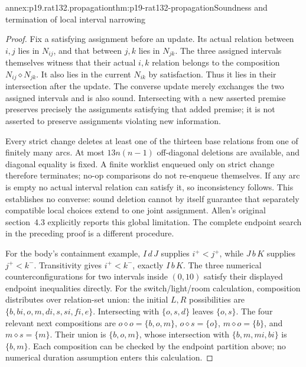 \begin{annexitem}{annex:p19.rat132.propagation}{thm:p19-rat132-propagation}{Soundness and termination of local interval narrowing}
\begin{proof}
Fix a satisfying assignment before an update. Its actual relation between
\(i,j\) lies in \(N_{ij}\), and that between \(j,k\) lies in
\(N_{jk}\). The three assigned intervals themselves witness that their
actual \(i,k\) relation belongs to the composition
\(N_{ij}\diamond N_{jk}\). It also lies in the current \(N_{ik}\)
by satisfaction. Thus it lies in their intersection after the update.
The converse update merely exchanges the two assigned intervals and is
also sound. Intersecting with a new asserted premise preserves precisely
the assignments satisfying that added premise; it is not asserted to
preserve assignments violating new information.

Every strict change deletes at least one of the thirteen base relations
from one of finitely many arcs. At most \(13n(n-1)\) off-diagonal
deletions are available, and diagonal equality is fixed. A finite worklist
enqueued only on strict change therefore terminates; no-op comparisons do
not re-enqueue themselves. If any arc is empty no actual interval relation
can satisfy it, so inconsistency follows. This establishes no converse:
sound deletion cannot by itself guarantee that separately compatible local
choices extend to one joint assignment. Allen's original section~4.3
explicitly reports this global limitation. The complete endpoint search
in the preceding proof is a different procedure.

For the body's containment example, \(I\,d\,J\) supplies
\(i^+<j^+\), while \(J\,b\,K\) supplies \(j^+<k^-\).
Transitivity gives \(i^+<k^-\), exactly \(I\,b\,K\).
The three numerical counterconfigurations for two intervals inside
\((0,10)\) satisfy their displayed endpoint inequalities directly.
For the switch/light/room calculation, composition distributes over
relation-set union: the initial \(L,R\) possibilities are
\(\{b,bi,o,m,di,s,si,fi,e\}\). Intersecting with
\(\{o,s,d\}\) leaves \(\{o,s\}\). The four relevant next
compositions are \(o\diamond o=\{b,o,m\}\),
\(o\diamond s=\{o\}\), \(m\diamond o=\{b\}\), and
\(m\diamond s=\{m\}\). Their union is \(\{b,o,m\}\),
whose intersection with \(\{b,m,mi,bi\}\) is \(\{b,m\}\).
Each composition can be checked by the endpoint partition above; no
numerical duration assumption enters this calculation.
\end{proof}
\end{annexitem}

